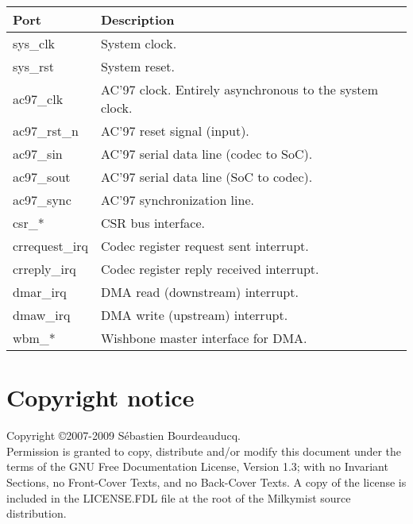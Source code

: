 \documentclass[a4paper,11pt]{article}
\begin{document}
\begin{tabularx}{\textwidth}{|l|X|}
\hline
\textbf{Port} & \textbf{Description} \\
\hline
sys\_clk & System clock. \\
sys\_rst & System reset. \\
\hline
ac97\_clk & AC'97 clock. Entirely asynchronous to the system clock. \\
ac97\_rst\_n & AC'97 reset signal (input). \\
ac97\_sin & AC'97 serial data line (codec to SoC). \\
ac97\_sout & AC'97 serial data line (SoC to codec). \\
ac97\_sync & AC'97 synchronization line. \\
\hline
csr\_* & CSR bus interface. \\
\hline
crrequest\_irq & Codec register request sent interrupt. \\
crreply\_irq & Codec register reply received interrupt. \\
dmar\_irq & DMA read (downstream) interrupt. \\
dmaw\_irq & DMA write (upstream) interrupt. \\
\hline
wbm\_* & Wishbone master interface for DMA. \\
\hline
\end{tabularx}

\section*{Copyright notice}
Copyright \copyright 2007-2009 S\'ebastien Bourdeauducq. \\
Permission is granted to copy, distribute and/or modify this document under the terms of the GNU Free Documentation License, Version 1.3; with no Invariant Sections, no Front-Cover Texts, and no Back-Cover Texts. A copy of the license is included in the LICENSE.FDL file at the root of the Milkymist source distribution.
\end{document}
